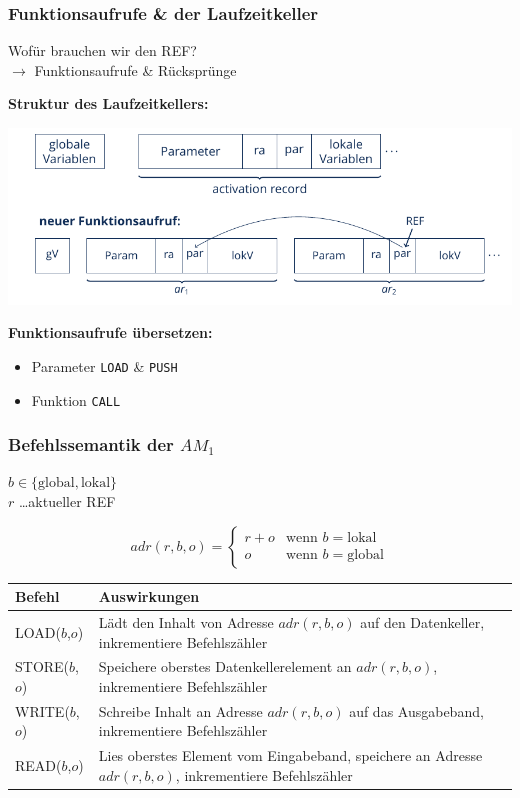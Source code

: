 \documentclass{beamer}
\renewcommand{\emph}[1]{\textbf{#1}}
\begin{document}
\begin{frame} \frametitle{Funktionsaufrufe \& der Laufzeitkeller}
	\footnotesize
	Wofür brauchen wir den REF?  \\
	$\to$ Funktionsaufrufe \& Rücksprünge
	
	\textbf{Struktur des Laufzeitkellers:}
	
	\includegraphics[width=\textwidth]{tut11-abb}
	
	\pause
	
	\textbf{Funktionsaufrufe übersetzen:}
	\begin{itemize}
		\item Parameter \texttt{LOAD} \& \texttt{PUSH}
		\item Funktion \texttt{CALL}
	\end{itemize}

\end{frame}

\begin{frame} \frametitle{Befehlssemantik der $AM_1$}
	\footnotesize
	\begin{minipage}{\dimexpr0.4\linewidth-\fboxrule-\fboxsep}
		$b \in \{ \text{global}, \text{lokal}\}$ \\
		$r$ \dots aktueller REF
	\end{minipage}
	\begin{minipage}{\dimexpr0.6\linewidth-\fboxrule-\fboxsep}
		\begin{equation*}
			adr(r,b,o) = \begin{cases}
			r+o & \text{wenn } b = \text{lokal} \\
			o & \text{wenn } b = \text{global}
			\end{cases}
		\end{equation*}
	\end{minipage}

	\pause
	
	\begin{tabular}{p{2cm} p{\dimexpr\linewidth-\fboxrule-\fboxsep-2cm}}
		\emph{Befehl} & \emph{Auswirkungen}  \\ \hline
		LOAD($b$,$o$) & Lädt den Inhalt von Adresse $adr(r,b,o)$ auf den Datenkeller, inkrementiere Befehlszähler \\
		STORE($b$,$o$) & Speichere oberstes Datenkellerelement an $adr(r,b,o)$, inkrementiere Befehlszähler \\
		WRITE($b$,$o$) & Schreibe Inhalt an Adresse $adr(r,b,o)$ auf das
		Ausgabeband, inkrementiere Befehlszähler \\
		READ($b$,$o$) & Lies oberstes Element vom Eingabeband, speichere
		an Adresse $adr(r,b,o)$, inkrementiere Befehlszähler \\
	\end{tabular}
\end{frame}
\end{document}
